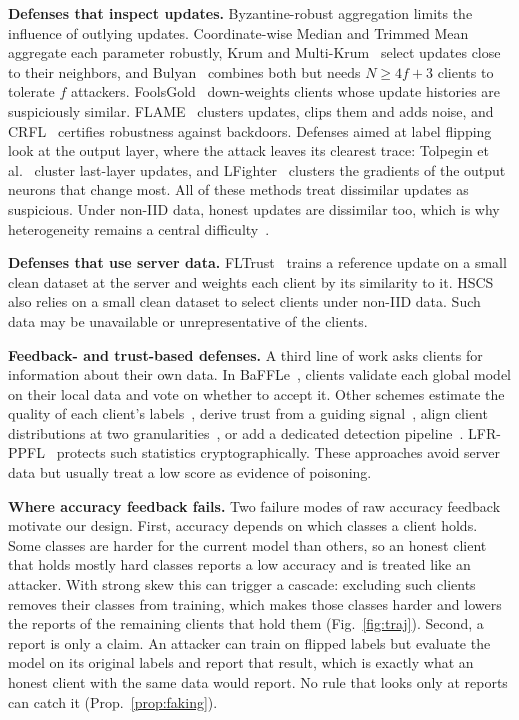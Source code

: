 \documentclass[conference]{IEEEtran}
\begin{document}
\textbf{Defenses that inspect updates.} Byzantine-robust aggregation limits the influence of outlying updates. Coordinate-wise Median and Trimmed Mean~\cite{yin2018byzantine} aggregate each parameter robustly, Krum and Multi-Krum~\cite{NIPS2017_f4b9ec30} select updates close to their neighbors, and Bulyan~\cite{mhamdi2018hidden} combines both but needs $N\ge4f+3$ clients to tolerate $f$ attackers. FoolsGold~\cite{fung2020limitations} down-weights clients whose update histories are suspiciously similar. FLAME~\cite{nguyen2022flame} clusters updates, clips them and adds noise, and CRFL~\cite{xie2021crfl} certifies robustness against backdoors. Defenses aimed at label flipping look at the output layer, where the attack leaves its clearest trace: Tolpegin et al.~\cite{tolpegin2020data} cluster last-layer updates, and LFighter~\cite{jebreel2024lfighter} clusters the gradients of the output neurons that change most. All of these methods treat dissimilar updates as suspicious. Under non-IID data, honest updates are dissimilar too, which is why heterogeneity remains a central difficulty~\cite{li2020federated,li2023hscs,shen2024lfrppfl}.

\textbf{Defenses that use server data.} FLTrust~\cite{cao2020fltrust} trains a reference update on a small clean dataset at the server and weights each client by its similarity to it. HSCS~\cite{li2023hscs} also relies on a small clean dataset to select clients under non-IID data. Such data may be unavailable or unrepresentative of the clients.

\textbf{Feedback- and trust-based defenses.} A third line of work asks clients for information about their own data. In BaFFLe~\cite{andreina2021baffle}, clients validate each global model on their local data and vote on whether to accept it. Other schemes estimate the quality of each client's labels~\cite{jiang2023dataquality,ovi2023confident}, derive trust from a guiding signal~\cite{li2025flgt}, align client distributions at two granularities~\cite{fedalign2026}, or add a dedicated detection pipeline~\cite{abroshan2025aitoprotect}. LFR-PPFL~\cite{shen2024lfrppfl} protects such statistics cryptographically. These approaches avoid server data but usually treat a low score as evidence of poisoning.

\textbf{Where accuracy feedback fails.} Two failure modes of raw accuracy feedback motivate our design. First, accuracy depends on which classes a client holds. Some classes are harder for the current model than others, so an honest client that holds mostly hard classes reports a low accuracy and is treated like an attacker. With strong skew this can trigger a cascade: excluding such clients removes their classes from training, which makes those classes harder and lowers the reports of the remaining clients that hold them (Fig.~\ref{fig:traj}). Second, a report is only a claim. An attacker can train on flipped labels but evaluate the model on its original labels and report that result, which is exactly what an honest client with the same data would report. No rule that looks only at reports can catch it (Prop.~\ref{prop:faking}).
\end{document}
